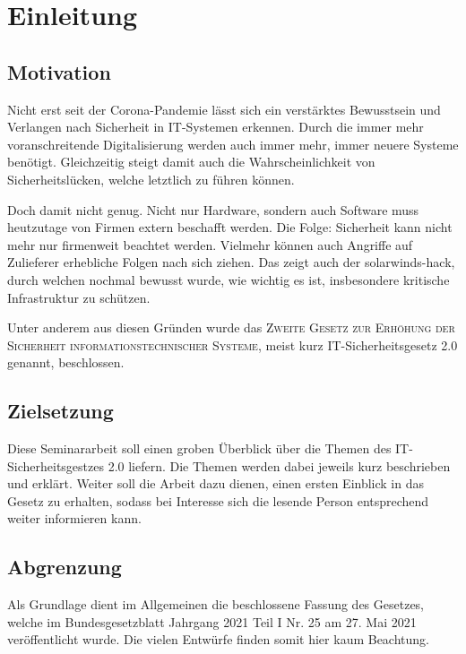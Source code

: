 \chapter{Einleitung}\label{ch:einleitung}

\section{Motivation}\label{sec:motivation}
Nicht erst seit der Corona-Pandemie lässt sich ein verstärktes Bewusstsein und Verlangen nach Sicherheit in IT-Systemen erkennen.
Durch die immer mehr voranschreitende Digitalisierung werden auch immer mehr, immer neuere Systeme benötigt.
Gleichzeitig steigt damit auch die Wahrscheinlichkeit von Sicherheitslücken,
welche letztlich zu  führen können.

Doch damit nicht genug.
Nicht nur Hardware, sondern auch Software muss heutzutage von Firmen extern beschafft werden.
Die Folge: Sicherheit kann nicht mehr nur firmenweit beachtet werden.
Vielmehr können auch Angriffe auf Zulieferer erhebliche Folgen nach sich ziehen.
Das zeigt auch der \gls{solarwinds-hack}, durch welchen nochmal bewusst wurde, wie wichtig es ist,
insbesondere kritische Infrastruktur zu schützen.

Unter anderem aus diesen Gründen wurde das \textsc{Zweite Gesetz zur Erhöhung der Sicherheit informationstechnischer Systeme},
meist kurz IT-Sicherheitsgesetz 2.0 genannt, beschlossen.


\section{Zielsetzung}\label{sec:zielsetzung}
Diese Seminararbeit soll einen groben Überblick über die Themen des IT-Sicherheitsgestzes 2.0 liefern.
Die Themen werden dabei jeweils kurz beschrieben und erklärt.
Weiter soll die Arbeit dazu dienen, einen ersten Einblick in das Gesetz zu erhalten,
sodass bei Interesse sich die lesende Person entsprechend weiter informieren kann.

\section{Abgrenzung}\label{sec:abgrenzung}
Als Grundlage dient im Allgemeinen die beschlossene Fassung des Gesetzes,
welche im Bundesgesetzblatt Jahrgang 2021 Teil I Nr. 25 am 27. Mai 2021 veröffentlicht wurde.
Die vielen Entwürfe finden somit hier kaum Beachtung.

